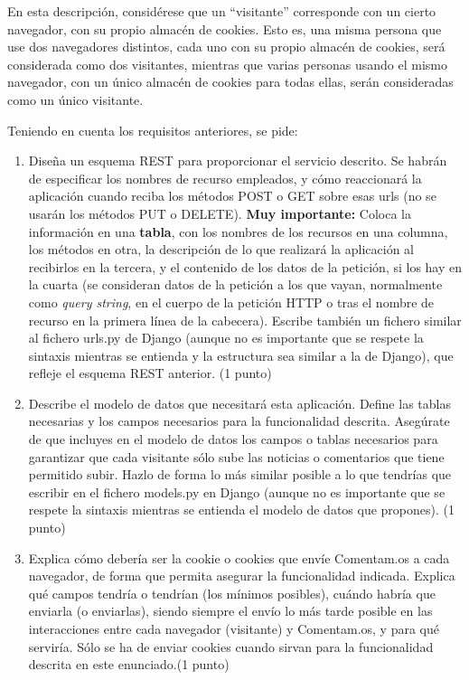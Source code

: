 En esta descripción, considérese que un ``visitante'' corresponde con un cierto navegador, con su propio almacén de cookies. Esto es, una misma persona que use dos navegadores distintos, cada uno con su propio almacén de cookies, será considerada como dos visitantes, mientras que varias personas usando el mismo navegador, con un único almacén de cookies para todas ellas, serán consideradas como un único visitante.

\newpage

Teniendo en cuenta los requisitos anteriores, se pide:

\begin{enumerate}
\item Diseña un esquema REST para proporcionar el servicio descrito. Se habrán de especificar los nombres de recurso empleados, y cómo reaccionará la aplicación cuando reciba los métodos POST o GET sobre esas urls (no se usarán los métodos PUT o DELETE). \textbf{Muy importante:} Coloca la información en una \textbf{tabla}, con los nombres de los recursos en una columna, los métodos en otra, la descripción de lo que realizará la aplicación al recibirlos en la tercera, y el contenido de los datos de la petición, si los hay en la cuarta (se consideran datos de la petición a los que vayan, normalmente como \emph{query string}, en el cuerpo de la petición HTTP o tras el nombre de recurso en la primera línea de la cabecera). Escribe también un fichero similar al fichero urls.py de Django (aunque no es importante que se respete la sintaxis mientras se entienda y la estructura sea similar a la de Django), que refleje el esquema REST anterior. (1 punto)

\item Describe el modelo de datos que necesitará esta aplicación. Define las tablas necesarias y los campos necesarios para la funcionalidad descrita. Asegúrate de que incluyes en el modelo de datos los campos o tablas necesarios para garantizar que cada visitante sólo sube las noticias o comentarios que tiene permitido subir. Hazlo de forma lo más similar posible a lo que tendrías que escribir en el fichero models.py en Django (aunque no es importante que se respete la sintaxis mientras se entienda el modelo de datos que propones). (1 punto)

\item Explica cómo debería ser la cookie o cookies que envíe Comentam.os a cada navegador, de forma que permita asegurar la funcionalidad indicada. Explica qué campos tendría o tendrían (los mínimos posibles), cuándo habría que enviarla (o enviarlas), siendo siempre el envío lo más tarde posible en las interacciones entre cada navegador (visitante) y Comentam.os, y para qué serviría. Sólo se ha de enviar cookies cuando sirvan para la funcionalidad descrita en este enunciado.(1 punto)
  

\end{enumerate}
